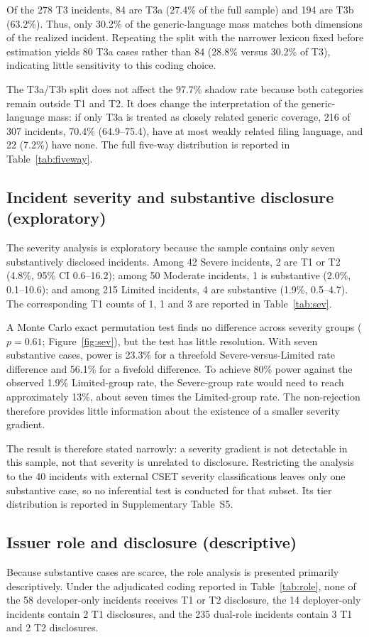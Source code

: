 \documentclass[utf8]{FrontiersinHarvard}
\begin{document}
Of the 278 T3 incidents, 84 are T3a (27.4\% of the full sample) and 194 are T3b (63.2\%). Thus, only 30.2\% of the generic-language mass matches both dimensions of the realized incident. Repeating the split with the narrower lexicon fixed before estimation yields 80 T3a cases rather than 84 (28.8\% versus 30.2\% of T3), indicating little sensitivity to this coding choice.

The T3a/T3b split does not affect the 97.7\% shadow rate because both categories remain outside T1 and T2. It does change the interpretation of the generic-language mass: if only T3a is treated as closely related generic coverage, 216 of 307 incidents, 70.4\% (64.9--75.4), have at most weakly related filing language, and 22 (7.2\%) have none. The full five-way distribution is reported in Table~\ref{tab:fiveway}.

\subsection{Incident severity and substantive disclosure (exploratory)}\label{sec:sev-results}
The severity analysis is exploratory because the sample contains only seven substantively disclosed incidents. Among 42 Severe incidents, 2 are T1 or T2 (4.8\%, 95\% CI 0.6--16.2); among 50 Moderate incidents, 1 is substantive (2.0\%, 0.1--10.6); and among 215 Limited incidents, 4 are substantive (1.9\%, 0.5--4.7). The corresponding T1 counts of 1, 1 and 3 are reported in Table~\ref{tab:sev}.

A Monte Carlo exact permutation test finds no difference across severity groups ($p = 0.61$; Figure~\ref{fig:sev}), but the test has little resolution. With seven substantive cases, power is 23.3\% for a threefold Severe-versus-Limited rate difference and 56.1\% for a fivefold difference. To achieve 80\% power against the observed 1.9\% Limited-group rate, the Severe-group rate would need to reach approximately 13\%, about seven times the Limited-group rate. The non-rejection therefore provides little information about the existence of a smaller severity gradient.

The result is therefore stated narrowly: a severity gradient is not detectable in this sample, not that severity is unrelated to disclosure. Restricting the analysis to the 40 incidents with external CSET severity classifications leaves only one substantive case, so no inferential test is conducted for that subset. Its tier distribution is reported in Supplementary Table~S5.

\subsection{Issuer role and disclosure (descriptive)}
Because substantive cases are scarce, the role analysis is presented primarily descriptively. Under the adjudicated coding reported in Table~\ref{tab:role}, none of the 58 developer-only incidents receives T1 or T2 disclosure, the 14 deployer-only incidents contain 2 T1 disclosures, and the 235 dual-role incidents contain 3 T1 and 2 T2 disclosures.
\end{document}
